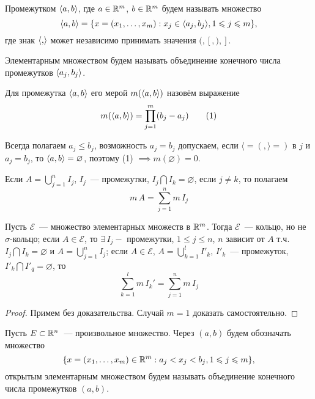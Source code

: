 \documentclass[main]{subfiles}
\begin{document}
\begin{definition}
    Промежутком $\langle{a,b}\rangle$, где $a\in\mathbb{R}^m$, $ b\in\mathbb{R}^m$ будем называть множество
    \[\langle{a,b}\rangle = \{x = (x_1,\dotsc,x_m): x_j \in \langle{a_j, b_j}\rangle, 1 \leqslant j \leqslant m\},\]
    где знак $\langle{,}\rangle$ может независимо принимать значения $(,[,),]$.
\end{definition}

\begin{definition}
    Элементарным множеством будем называть объединение конечного числа промежутков $\langle{a_j,b_j}\rangle$.
\end{definition}

\begin{definition}
    Для промежутка $\langle{a,b}\rangle$ его мерой $m(\langle{a,b}\rangle)$ назовём выражение
    \[ m(\langle{a,b}\rangle)=\prod_{j=1}^{m}(b_j-a_j)\tag{1} \]
\end{definition}

\begin{remark}
    Всегда полагаем $a_j\le b_j$, возможность $a_j=b_j$ допускаем, если $\langle=(, \rangle = )$ в $j$ и $a_j=b_j$, то $\langle{a,b}\rangle=\varnothing$, поэтому (1) $\implies m(\varnothing)=0$.
\end{remark}

\begin{remark}
    Если $A = \bigcup_{j=1}^n I_j$, $I_j$~--- промежутки, $I_j\bigcap I_k=\varnothing$, если $j\neq k$, то полагаем
    \[ m\,A=\sum_{j=1}^n m\,I_j\tag{2} \]
\end{remark}

\begin{theorem}
    Пусть $\mathcal{E}$~--- множество элементарных множеств в $\mathbb{R}^m$.
    Тогда $\mathcal{E}$~--- кольцо, но не $\sigma$-кольцо; если $A\in\mathcal{E}$, то $\exists\,I_j-$ промежутки, $1\le j\le n$, $n$ зависит от $A$ т.ч. $I_j\bigcap I_k=\varnothing$ и $A=\bigcup_{j=1}^n I_j$; если $A\in\mathcal{E}$, $ A=\bigcup_{k=1}^l I'_k$, $I'_k$~--- промежуток, $I'_k\bigcap I'_q=\varnothing$, то
    \[ \sum_{k=1}^l m\,I_k'=\sum_{j=1}^n m\,I_j \]
\end{theorem}

\begin{proof}
    Примем без доказательства.
    Случай $m=1$ доказать самостоятельно.
\end{proof}

\begin{definition}
    Пусть $E\subset\mathbb{R}^n$~--- произвольное множество.
    Через $(a,b)$ будем обозначать множество
    \[\{ x=(x_1,\dotsc,x_m)\in\mathbb{R}^m: a_j<x_j<b_j, 1\leqslant j\leqslant m\},\]
    открытым элементарным множеством будем называть объединение конечного числа промежутков $(a,b)$.
\end{definition}
\end{document}
